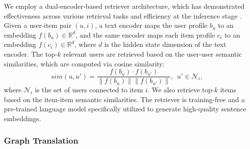 

 We employ a dual-encoder-based retriever architecture, which has demonstrated effectiveness across various retrieval tasks \cite{ni2022large} and efficiency at the inference stage \cite{lewis2020retrieval,izacardunsupervised}. Given a user-item pair $(u, i)$, a text encoder maps the user profile $b_u$ to an embedding $f(b_u) \in \mathbb{R}^d$, and the same encoder maps each item profile $c_i$ to an embedding $f(c_i) \in \mathbb{R}^d$, where $d$ is the hidden state dimension of the text encoder. The top-$k$ relevant users are retrieved based on the user-user semantic similarities, which are computed via cosine similarity:
\begin{equation}
sim(u, u') = \frac{f(b_u) \cdot f(b_{u'})}{\|f(b_u)\| \|f(b_{u'})\|}, \ \ u' \in \mathcal{N}_i,
\label{eq:node-level}
\end{equation}
\noindent where $\mathcal{N}_i$ is the set of users connected to item $i$. We also retrieve top-$k$ items based on the item-item semantic similarities. The retriever is training-free and a pre-trained language model specifically utilized to generate high-quality sentence embeddings.

\subsubsection{Graph Translation}

